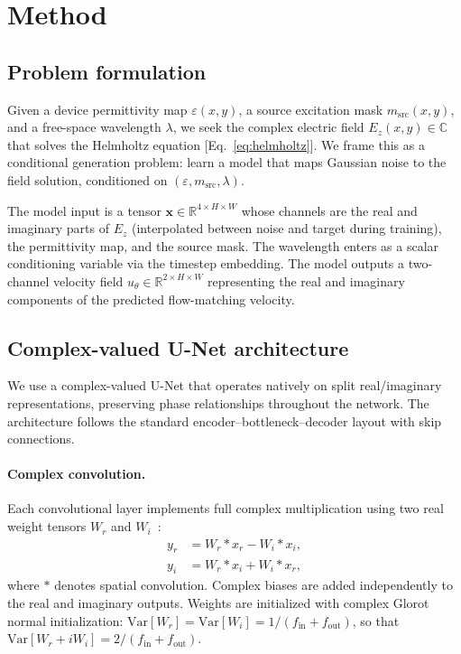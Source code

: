 \section{\label{sec:method}Method}

\subsection{Problem formulation}

Given a device permittivity map $\varepsilon(x,y)$, a source excitation mask $m_\text{src}(x,y)$, and a free-space
wavelength $\lambda$, we seek the complex electric field $E_z(x,y)\in\mathbb{C}$ that solves the Helmholtz equation
[Eq.~\eqref{eq:helmholtz}]. We frame this as a conditional generation problem: learn a model that maps Gaussian noise
to the field solution, conditioned on $(\varepsilon, m_\text{src}, \lambda)$.

The model input is a tensor $\mathbf{x}\in\mathbb{R}^{4\times H\times W}$ whose channels are the real and imaginary
parts of $E_z$ (interpolated between noise and target during training), the permittivity map, and the source mask. The
wavelength enters as a scalar conditioning variable via the timestep embedding. The model outputs a two-channel
velocity field $\hat{u}_\theta\in\mathbb{R}^{2\times H\times W}$ representing the real and imaginary components of the
predicted flow-matching velocity.

\subsection{Complex-valued U-Net architecture}

We use a complex-valued U-Net that operates natively on split real/imaginary representations, preserving phase
relationships throughout the network. The architecture follows the standard encoder--bottleneck--decoder layout with
skip connections.

\paragraph{Complex convolution.}
Each convolutional layer implements full complex multiplication using two real weight
tensors $W_r$ and $W_i$~\cite{Trabelsi2018DeepComplex}:
\begin{align}
    y_r &= W_r * x_r - W_i * x_i, \nonumber\\
    y_i &= W_r * x_i + W_i * x_r,
    \label{eq:complex_conv}
\end{align}
where $*$ denotes spatial convolution. Complex biases are added independently to the real and imaginary outputs.
Weights are initialized with complex Glorot normal initialization: $\mathrm{Var}[W_r] = \mathrm{Var}[W_i] =
1/(f_\text{in} + f_\text{out})$, so that $\mathrm{Var}[W_r + iW_i] = 2/(f_\text{in} + f_\text{out})$.

